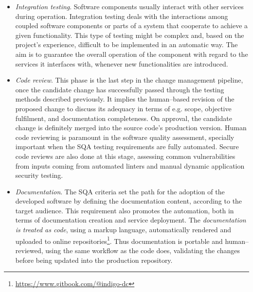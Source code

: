\documentclass[journal]{IEEEtran}
\begin{document}
\begin{itemize}
\item \textit{Integration testing}. Software components usually interact with other services during
operation. Integration testing deals with the interactions among coupled software components or
parts of a system that cooperate to achieve a given functionality. This type of testing might be
complex and, based on the project's experience, difficult to be implemented in an automatic way. The aim is to
guarantee the overall operation of the component with regard to the services it interfaces with,
whenever new functionalities are introduced.

\item \textit{Code review}.
This phase is the last step in the change management pipeline, once the candidate change has
successfully passed through the testing methods described previously. It implies the human--based
revision of the proposed change to discuss its adequacy in terms of e.g. scope, objective fulfilment,
and documentation completeness. On approval, the candidate change is definitely merged into
the source code's production version. Human code reviewing is paramount in the software quality assessment, specially
important when the SQA testing requirements are fully automated. Secure code reviews are also
done at this stage, assessing common vulnerabilities from inputs coming from automated linters
and manual dynamic application security testing.

\item \textit{Documentation}.
The SQA criteria set the path for the adoption of the developed software by
defining the documentation content, according to the target audience. This requirement also
promotes the automation, both in terms of documentation creation and service deployment. The
\textit{documentation is treated as code}, using a markup language, automatically rendered and
uploaded to online repositories\footnote{\url{https://www.gitbook.com/@indigo-dc}}.
Thus documentation is portable and
human--reviewed, using the same workflow as the code does, validating the changes before being
updated into the production repository.


\end{itemize}
\end{document}
